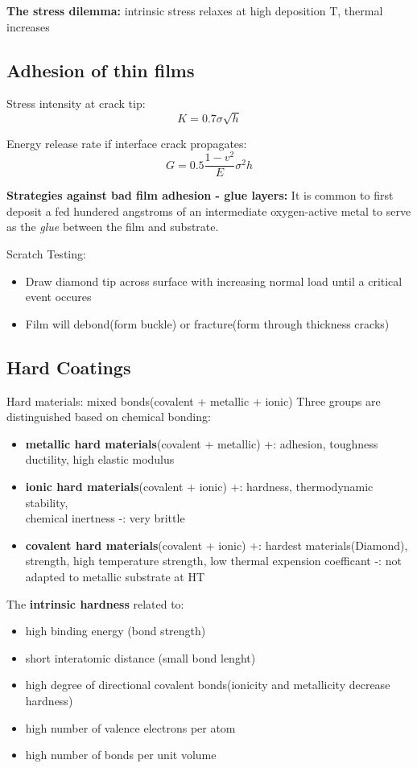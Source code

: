 \textbf{The stress dilemma:} intrinsic stress relaxes at high deposition T, thermal increases

\subsection{Adhesion of thin films}

Stress intensity at crack tip:
\[
K = 0.7 \sigma\sqrt{h}
\]

Energy release rate if interface crack propagates:
\[
G = 0.5 \frac{1-v^2}{E}\sigma^2 h
\]

\textbf{Strategies against bad film adhesion - glue layers:} It is common to first deposit a fed hundered angstroms of an intermediate oxygen-active metal to serve as the \textit{glue} between the film and substrate.

Scratch Testing:
\begin{itemize}
    \item Draw diamond tip across surface with increasing normal load until a critical event occures
    \item Film will debond(form buckle) or fracture(form through thickness cracks)
\end{itemize}

\subsection{Hard Coatings}
Hard materials: mixed bonds(covalent + metallic + ionic)
Three groups are distinguished based on chemical bonding:
\begin{itemize}
    \item \textbf{metallic hard materials}(covalent + metallic)
    \subitem +: adhesion, toughness ductility, high elastic modulus
    \item \textbf{ionic hard materials}(covalent + ionic)
    \subitem +: hardness, thermodynamic stability, \\chemical inertness
    \subitem -: very brittle
    \item \textbf{covalent hard materials}(covalent + ionic)
    \subitem +: hardest materials(Diamond), strength, high temperature strength, low thermal expension coefficant
    \subitem -: not adapted to metallic substrate at HT
\end{itemize}

The \textbf{intrinsic hardness }related to:
\begin{itemize}
    \item high binding energy (bond strength)
    \item short interatomic distance (small bond lenght)
    \item high degree of directional covalent bonds(ionicity and metallicity decrease hardness)
    \item high number of valence electrons per atom
    \item high number of bonds per unit volume
\end{itemize}

